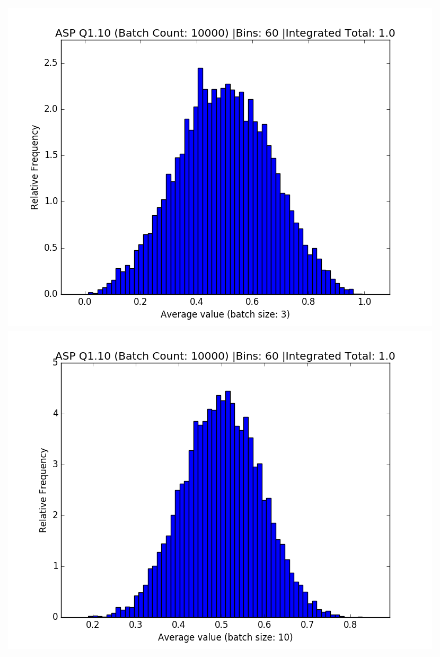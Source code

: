 \documentclass[]{article}
\begin{document}
\begin{figure}[h]
	\centering
	\begin{minipage}[h]{0.45\linewidth}
		\includegraphics[width=1\linewidth]{one_ten_three}
	\end{minipage}
	\quad
	\begin{minipage}[h]{0.45\linewidth}
		\includegraphics[width=1\linewidth]{one_ten_ten}
	\end{minipage}
\end{figure}
\end{document}
